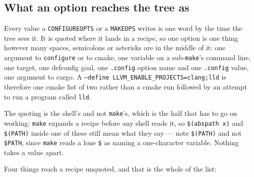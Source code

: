 \documentclass{article}
\begin{document}
\subsection{What an option reaches the tree as \label{buildsys:quoting}}

Every value a \texttt{CONFIGUREOPTS} or a \texttt{MAKEOPS} writes is
one word by the time the tree sees it.  It is quoted where it lands in
a recipe, so one option is one thing however many spaces, semicolons
or asterisks are in the middle of it: one argument to
\texttt{configure} or to cmake, one variable on a sub-\texttt{make}'s
command line, one target, one defconfig goal, one \texttt{.config}
option name and one \texttt{.config} value, one argument to cargo.  A
\texttt{--define LLVM\_ENABLE\_PROJECTS=clang;lld} is therefore one
cmake list of two rather than a cmake run followed by an attempt to
run a program called \texttt{lld}.

The quoting is the shell's and not \texttt{make}'s, which is the half
that has to go on working: \texttt{make} expands a recipe before any
shell reads it, so \texttt{\$(abspath x)} and \texttt{\$(PATH)} inside
one of these still mean what they say --- note \texttt{\$(PATH)} and
not \texttt{\$PATH}, since \texttt{make} reads a lone \texttt{\$} as
naming a one-character variable.  Nothing takes a value apart.

Four things reach a recipe unquoted, and that is the whole of the
list:
\end{document}
